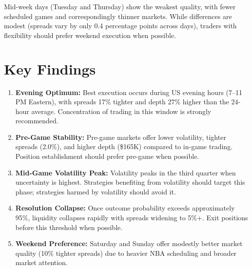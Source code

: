 Mid-week days (Tuesday and Thursday) show the weakest quality, with fewer scheduled games and correspondingly thinner markets. While differences are modest (spreads vary by only 0.4 percentage points across days), traders with flexibility should prefer weekend execution when possible.

\section{Key Findings}

\begin{keyfindings}
\begin{enumerate}
    \item \textbf{Evening Optimum:} Best execution occurs during US evening hours (7--11 PM Eastern), with spreads 17\% tighter and depth 27\% higher than the 24-hour average. Concentration of trading in this window is strongly recommended.

    \item \textbf{Pre-Game Stability:} Pre-game markets offer lower volatility, tighter spreads (2.0\%), and higher depth (\$165K) compared to in-game trading. Position establishment should prefer pre-game when possible.

    \item \textbf{Mid-Game Volatility Peak:} Volatility peaks in the third quarter when uncertainty is highest. Strategies benefiting from volatility should target this phase; strategies harmed by volatility should avoid it.

    \item \textbf{Resolution Collapse:} Once outcome probability exceeds approximately 95\%, liquidity collapses rapidly with spreads widening to 5\%+. Exit positions before this threshold when possible.

    \item \textbf{Weekend Preference:} Saturday and Sunday offer modestly better market quality (10\% tighter spreads) due to heavier NBA scheduling and broader market attention.
\end{enumerate}
\end{keyfindings}

